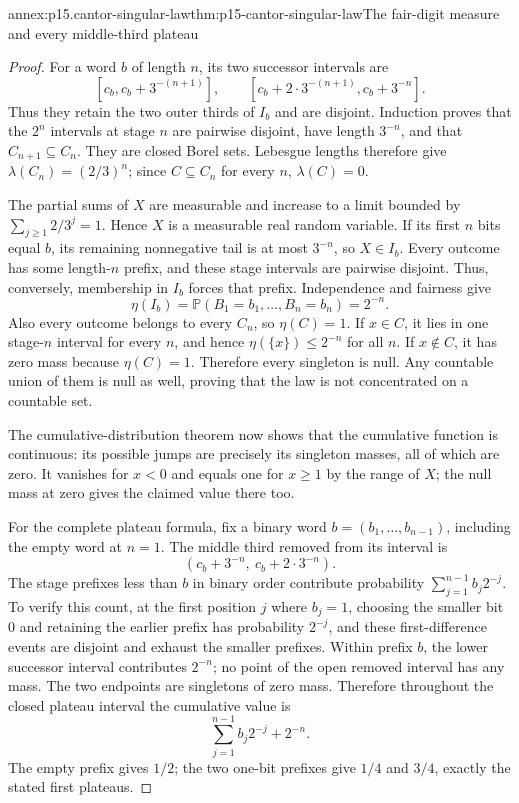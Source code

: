 \begin{annexitem}{annex:p15.cantor-singular-law}{thm:p15-cantor-singular-law}{The fair-digit measure and every middle-third plateau}
\begin{proof}
For a word \(b\) of length \(n\), its two successor intervals are
\[
 [c_b,c_b+3^{-(n+1)}],\qquad
 [c_b+2\cdot3^{-(n+1)},c_b+3^{-n}].
\]
Thus they retain the two outer thirds of \(I_b\) and are disjoint.
Induction proves that the \(2^n\) intervals at stage \(n\) are
pairwise disjoint, have length \(3^{-n}\), and that \(C_{n+1}\subseteq C_n\).
They are closed Borel sets. Lebesgue lengths therefore give
\(\lambda(C_n)=(2/3)^n\); since \(C\subseteq C_n\) for every \(n\),
\(\lambda(C)=0\).

The partial sums of \(X\) are measurable and increase to a limit
bounded by \(\sum_{j\geq1}2/3^j=1\).
Hence \(X\) is a measurable real random variable.
If its first \(n\) bits equal \(b\), its remaining nonnegative tail
is at most \(3^{-n}\), so \(X\in I_b\).
Every outcome has some length-\(n\) prefix, and these stage intervals
are pairwise disjoint. Thus, conversely, membership in \(I_b\)
forces that prefix. Independence and fairness give
\[
                    \eta(I_b)
                        =\mathbb P(B_1=b_1,\ldots,B_n=b_n)=2^{-n}.
\]
Also every outcome belongs to every \(C_n\), so \(\eta(C)=1\).
If \(x\in C\), it lies in one stage-\(n\) interval for every \(n\),
and hence \(\eta(\{x\})\leq2^{-n}\) for all \(n\).
If \(x\notin C\), it has zero mass because \(\eta(C)=1\).
Therefore every singleton is null.
Any countable union of them is null as well, proving that the law
is not concentrated on a countable set.

The cumulative-distribution theorem now shows that the cumulative
function is continuous: its possible jumps are precisely its
singleton masses, all of which are zero.
It vanishes for \(x<0\) and equals one for \(x\geq1\) by the range
of \(X\); the null mass at zero gives the claimed value there too.

For the complete plateau formula, fix a binary word
\(b=(b_1,\ldots,b_{n-1})\), including the empty word at \(n=1\).
The middle third removed from its interval is
\[
               (c_b+3^{-n},\ c_b+2\cdot3^{-n}).
\]
The stage prefixes less than \(b\) in binary order contribute
probability \(\sum_{j=1}^{n-1}b_j2^{-j}\).
To verify this count, at the first position \(j\) where \(b_j=1\),
choosing the smaller bit 0 and retaining the earlier prefix has
probability \(2^{-j}\), and these first-difference events are
disjoint and exhaust the smaller prefixes.
Within prefix \(b\), the lower successor interval contributes
\(2^{-n}\); no point of the open removed interval has any mass.
The two endpoints are singletons of zero mass. Therefore throughout
the closed plateau interval the cumulative value is
\[
                    \sum_{j=1}^{n-1}b_j2^{-j}+2^{-n}.
\]
The empty prefix gives \(1/2\); the two one-bit prefixes give
\(1/4\) and \(3/4\), exactly the stated first plateaus.


\end{proof}
\end{annexitem}
